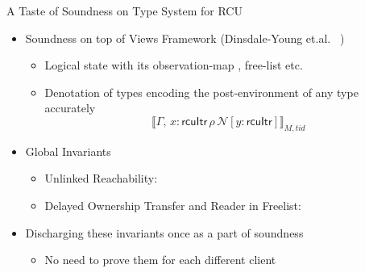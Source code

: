 \documentclass[aspectratio=169,xcolor=dvipsnames]{beamer}
\begin{document}
\begin{frame}{A Taste of Soundness on Type System for RCU}
\begin{itemize}
    \item Soundness on top of Views Framework (Dinsdale-Young et.al. ~\cite{})
    \begin{itemize}
        \item Logical state with its observation-map , free-list etc. 
        \item Denotation of types encoding the post-environment of any type accurately
        \[\llbracket \Gamma,\, x:\textsf{rcuItr} \, \rho \, \mathcal{N}[y:\textsf{rcuItr}]  \rrbracket_{M,tid}\]
    \end{itemize}
    \item Global Invariants
    \begin{itemize}
        \item Unlinked Reachability:
        \item Delayed Ownership Transfer and Reader in Freelist:
    \end{itemize}
    \item Discharging these invariants once as a part of soundness
    \begin{itemize}
        \item No need to prove them for each different client
    \end{itemize}
\end{itemize}
\end{frame}
\end{document}
